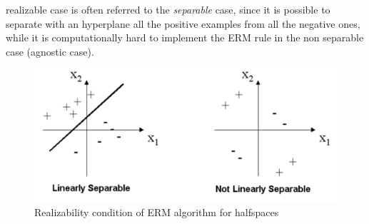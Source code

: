 \documentclass[12pt]{report}
\theoremstyle{plain}
\begin{document}
\begin{flushleft}
realizable case is often referred to the \textit{separable} case, since it is 
possible to separate with an hyperplane all the positive examples from all the 
negative ones, while it is computationally hard to implement the ERM rule in 
the non separable case (agnostic case).
\begin{figure}[!h]
	\centering
	\includegraphics[scale=0.5]{images/halfspaces_realizability.pdf}
	\caption{Realizability condition of ERM algorithm for halfspaces}
	\label{fig:halfspaces_realizability}
\end{figure}


\end{flushleft}
\end{document}
